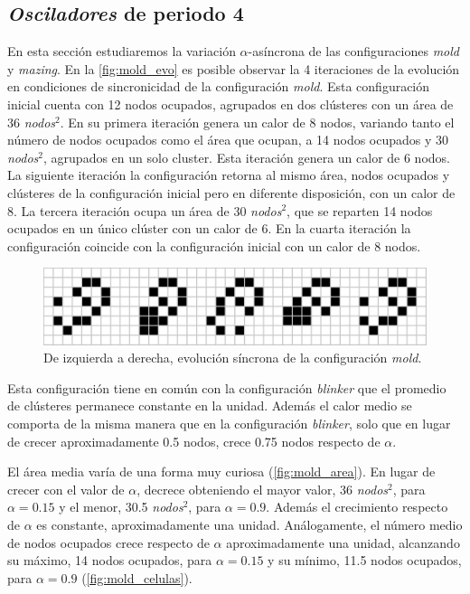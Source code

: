\documentclass[../proyecto.tex]{memoir}
\begin{document}
\subsection{\textit{Osciladores} de periodo 4}

En esta sección estudiaremos la variación $\alpha$-asíncrona de las configuraciones \textit{mold} y \textit{mazing}. En la \autoref{fig:mold_evo} es posible observar la 4 iteraciones de la evolución en condiciones de sincronicidad de la configuración \textit{mold}. Esta configuración inicial cuenta con 12 nodos ocupados, agrupados en dos clústeres con un área de 36 \textit{nodos}$^2$. En su primera iteración genera un calor de 8 nodos, variando tanto el número de nodos ocupados como el área que ocupan, a 14 nodos ocupados y 30 \textit{nodos}$^2$, agrupados en un solo cluster. Esta iteración genera un calor de 6 nodos. La siguiente iteración la configuración retorna al mismo área, nodos ocupados y clústeres de la configuración inicial pero en diferente disposición, con un calor de 8. La tercera iteración ocupa un área de 30 \textit{nodos}$^2$, que se reparten 14 nodos ocupados en un único clúster con un calor de 6. En la cuarta iteración la configuración coincide con la configuración inicial con un calor de 8 nodos.

\begin{figure}[H]
	\centering
    \includegraphics[width=\textwidth]{./images/mold_evo.png}
    \caption{De izquierda a derecha, evolución síncrona de la configuración \textit{mold}.}
    \label{fig:mold_evo}
\end{figure}

Esta configuración tiene en común con la configuración \textit{blinker} que el promedio de clústeres permanece constante en la unidad. Además el calor medio se comporta de la misma manera que en la configuración \textit{blinker}, solo que en lugar de crecer aproximadamente 0.5 nodos, crece 0.75 nodos respecto de $\alpha$.

El área media varía de una forma muy curiosa (\autoref{fig:mold_area}). En lugar de crecer con el valor de $\alpha$, decrece obteniendo el mayor valor, 36 \textit{nodos}$^2$, para $\alpha=0.15$ y el menor, 30.5 \textit{nodos}$^2$, para $\alpha=0.9$. Además el crecimiento respecto de $\alpha$ es constante, aproximadamente una unidad. Análogamente, el número medio de nodos ocupados crece respecto de $\alpha$ aproximadamente una unidad, alcanzando su máximo, 14 nodos ocupados, para $\alpha=0.15$ y su mínimo, 11.5 nodos ocupados, para $\alpha=0.9$ (\autoref{fig:mold_celulas}).
\end{document}
